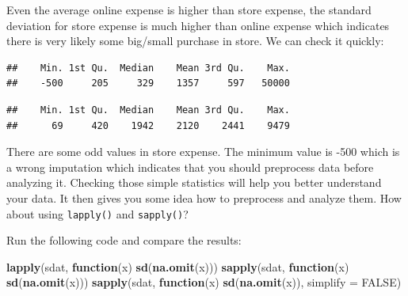 \documentclass[12pt,]{krantz}
\newenvironment{Shaded}{\begin{snugshade}}{\end{snugshade}}
\newcommand{\KeywordTok}[1]{\textcolor[rgb]{0.13,0.29,0.53}{\textbf{#1}}}
\newcommand{\DataTypeTok}[1]{\textcolor[rgb]{0.13,0.29,0.53}{#1}}
\newcommand{\OtherTok}[1]{\textcolor[rgb]{0.56,0.35,0.01}{#1}}
\newcommand{\ControlFlowTok}[1]{\textcolor[rgb]{0.13,0.29,0.53}{\textbf{#1}}}
\newcommand{\OperatorTok}[1]{\textcolor[rgb]{0.81,0.36,0.00}{\textbf{#1}}}
\newcommand{\NormalTok}[1]{#1}
\theoremstyle{definition}
\theoremstyle{definition}
\theoremstyle{definition}
\theoremstyle{remark}
\begin{document}
Even the average online expense is higher than store expense, the
standard deviation for store expense is much higher than online expense
which indicates there is very likely some big/small purchase in store.
We can check it quickly:

\begin{Shaded}
\end{Shaded}

\begin{verbatim}
##    Min. 1st Qu.  Median    Mean 3rd Qu.    Max. 
##    -500     205     329    1357     597   50000
\end{verbatim}

\begin{Shaded}
\end{Shaded}

\begin{verbatim}
##    Min. 1st Qu.  Median    Mean 3rd Qu.    Max. 
##      69     420    1942    2120    2441    9479
\end{verbatim}

There are some odd values in store expense. The minimum value is -500
which is a wrong imputation which indicates that you should preprocess
data before analyzing it. Checking those simple statistics will help you
better understand your data. It then gives you some idea how to
preprocess and analyze them. How about using \texttt{lapply()} and
\texttt{sapply()}?

Run the following code and compare the results:

\begin{Shaded}
\begin{Highlighting}[]
\KeywordTok{lapply}\NormalTok{(sdat, }\ControlFlowTok{function}\NormalTok{(x) }\KeywordTok{sd}\NormalTok{(}\KeywordTok{na.omit}\NormalTok{(x)))}
\KeywordTok{sapply}\NormalTok{(sdat, }\ControlFlowTok{function}\NormalTok{(x) }\KeywordTok{sd}\NormalTok{(}\KeywordTok{na.omit}\NormalTok{(x)))}
\KeywordTok{sapply}\NormalTok{(sdat, }\ControlFlowTok{function}\NormalTok{(x) }\KeywordTok{sd}\NormalTok{(}\KeywordTok{na.omit}\NormalTok{(x)), }\DataTypeTok{simplify =} \OtherTok{FALSE}\NormalTok{)}
\end{Highlighting}
\end{Shaded}
\end{document}

